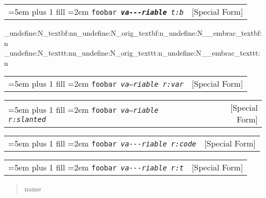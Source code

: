 \documentclass{book}
\newcommand\GNUTexinfocommandstyletextvar[1]{{\normalfont{}\textsl{#1}}}%
\begin{document}
%

%
%
\noindent\begin{tabularx}{\linewidth}{@{}Xr}
\rightskip=5em plus 1 fill
\hangindent=2em
\noindent\texttt{foobar \EmbracOn{}\textnormal{\textsl{\texttt{\textbf{va{-}{-}{-}riable}} t:b}}\EmbracOff{}}& [Special Form]
\end{tabularx}
\ExplSyntaxOn%
\cs_undefine:N{\embrac_textbf:nn}\cs_undefine:N{\embrac_orig_textbf:n}\cs_undefine:N{\__embrac_textbf:n}%
\cs_undefine:N{\embrac_texttt:nn}\cs_undefine:N{\embrac_orig_texttt:n}\cs_undefine:N{\__embrac_texttt:n}%
\ExplSyntaxOff%

%

\noindent\begin{tabularx}{\linewidth}{@{}Xr}
\rightskip=5em plus 1 fill
\hangindent=2em
\noindent\texttt{foobar \EmbracOn{}\textnormal{\textsl{\EmbracOff{}\textnormal{\GNUTexinfocommandstyletextvar{va---riable}}\EmbracOn{} r:var}}\EmbracOff{}}& [Special Form]
\end{tabularx}

%

\noindent\begin{tabularx}{\linewidth}{@{}Xr}
\rightskip=5em plus 1 fill
\hangindent=2em
\noindent\texttt{foobar \EmbracOn{}\textnormal{\textsl{\EmbracOff{}\textnormal{\textsl{va---riable}}\EmbracOn{} r:slanted}}\EmbracOff{}}& [Special Form]
\end{tabularx}

%

\noindent\begin{tabularx}{\linewidth}{@{}Xr}
\rightskip=5em plus 1 fill
\hangindent=2em
\noindent\texttt{foobar \EmbracOn{}\textnormal{\textsl{\EmbracOff{}\textnormal{\texttt{va{-}{-}{-}riable}}\EmbracOn{} r:code}}\EmbracOff{}}& [Special Form]
\end{tabularx}

%

\noindent\begin{tabularx}{\linewidth}{@{}Xr}
\rightskip=5em plus 1 fill
\hangindent=2em
\noindent\texttt{foobar \EmbracOn{}\textnormal{\textsl{\EmbracOff{}\textnormal{\texttt{va{-}{-}{-}riable}}\EmbracOn{} r:t}}\EmbracOff{}}& [Special Form]
\end{tabularx}

%
\begin{quote}
\unskip{\parskip=0pt\noindent}%
name
\end{quote}
\end{document}
